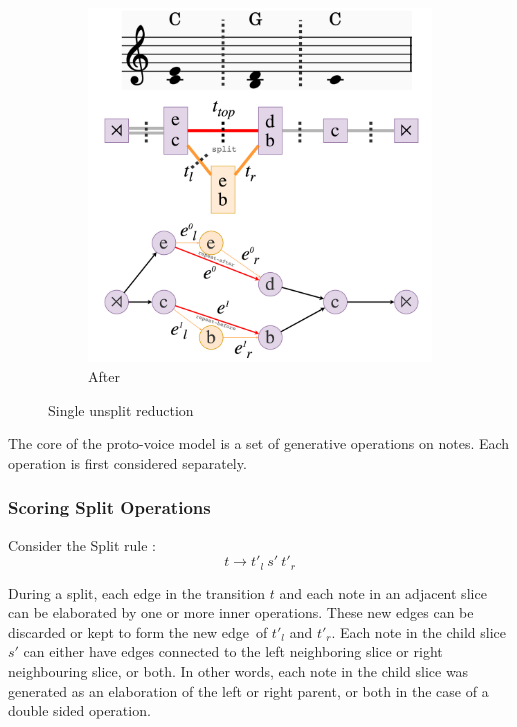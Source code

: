 \documentclass[12pt,a4paper,twoside,openany]{report} \usepackage[pdfborder={0 0 0}]{hyperref}    %
\theoremstyle{definition} \newtheorem{definition}{Definition}[section]
\begin{document}
\begin{figure}[h]
\begin{subfigure}[t]{.49\textwidth}
    \centering\includegraphics[keepaspectratio,width=\textwidth]{impl/reduction/after.png} \caption{After}
    \label{fig:reductionAfter} \end{subfigure}

  \captionsetup{width=.9\linewidth} \caption{Single unsplit reduction} \label{fig:reductionStep} \end{figure} 

  The core of the proto-voice model is a set of generative operations on notes. Each operation is first
  considered separately.

    \subsubsection{Scoring Split Operations} Consider the Split rule : \[t \to t'_{l}~s'~t'_{r}\] \par
    During a split, each edge in the transition $t$ and each note in an adjacent slice can be elaborated by one or more
    inner operations. These new edges can be discarded or kept to form the new edge of $t'_l$ and $t'_r$.
    Each note in the child slice $s'$ can either have edges connected to the left neighboring slice or right
    neighbouring slice, or both. In other words, each note in the child slice was generated as an elaboration of the
    left or right parent, or both in the case of a double sided operation. 
\end{document}
